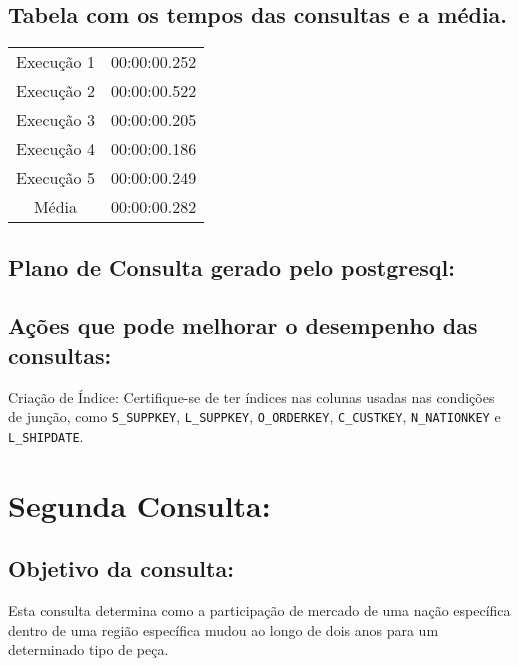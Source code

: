 \documentclass[12pt]{article}
\begin{document}
\begin{landscape}
\subsection{Tabela com os tempos das consultas e a média.}
\begin{tabular}{|c|c|}
  \hline
  Execução 1 & 00:00:00.252 \\
  Execução 2 & 00:00:00.522 \\
  Execução 3 & 00:00:00.205 \\
  Execução 4 & 00:00:00.186 \\
  Execução 5 & 00:00:00.249 \\
  \hline
  Média & 00:00:00.282 \\
  \hline
\end{tabular}

\subsection{Plano de Consulta gerado pelo postgresql:}

\subsection{Ações que pode melhorar o desempenho das 
consultas:} Criação de Índice: Certifique-se de ter índices nas colunas usadas nas condições de junção, como \texttt{S\_SUPPKEY}, \texttt{L\_SUPPKEY}, \texttt{O\_ORDERKEY}, \texttt{C\_CUSTKEY}, \texttt{N\_NATIONKEY} e \texttt{L\_SHIPDATE}.

\section{Segunda Consulta:}


\subsection{Objetivo da consulta:}
Esta consulta determina como a participação de mercado de uma nação específica dentro de uma região específica mudou ao longo de dois anos para um determinado tipo de peça.


\end{landscape}
\end{document}
